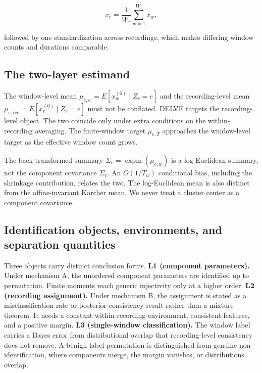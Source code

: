 \begin{equation}\label{eq:rec-estimand}
x_r=\frac1{W_r}\sum_{w=1}^{W_r}x_w,
\end{equation}

followed by one standardization across recordings, which makes differing
window counts and durations comparable.

\subsection{The two-layer estimand}\label{the-two-layer-estimand}

The window-level mean \(\mu_{e,w}=E[x_w^{(0)}\mid Z_r=e]\) and the
recording-level mean \(\mu_{e,\mathrm{rec}}=E[x_r^{(0)}\mid Z_r=e]\)
must not be conflated. DELVE targets the recording-level object. The two
coincide only under extra conditions on the within-recording averaging.
The finite-window target \(\mu_{e,T}\) approaches the window-level
target as the effective window count grows.

The back-transformed summary
\(\widetilde\Sigma_e=\operatorname{expm}(\mu_{e,w})\) is a log-Euclidean
summary, not the component covariance \(\Sigma_e\). An \(O(1/T_w)\)
conditional bias, including the shrinkage contribution, relates the two.
The log-Euclidean mean is also distinct from the affine-invariant
Karcher mean. We never treat a cluster center as a component covariance.

\subsection{Identification objects, environments, and separation
quantities}\label{identification-objects-environments-and-separation-quantities}

Three objects carry distinct conclusion forms. \textbf{L1 (component
parameters).} Under mechanism A, the unordered component parameters are
identified up to permutation. Finite moments reach generic injectivity
only at a higher order. \textbf{L2 (recording assignment).} Under
mechanism B, the assignment is stated as a misclassification-rate or
posterior-consistency result rather than a mixture theorem. It needs a
constant within-recording environment, consistent features, and a
positive margin. \textbf{L3 (single-window classification).} The window
label carries a Bayes error from distributional overlap that
recording-level consistency does not remove. A benign label permutation
is distinguished from genuine non-identification, where components
merge, the margin vanishes, or distributions overlap.


